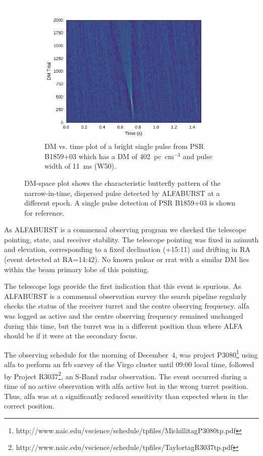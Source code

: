 \documentclass[a4paper,fleqn,usenatbib]{mnras}
\begin{document}
\begin{figure}
\begin{subfigure}[t]{0.5\textwidth}
        \includegraphics[width=1.0\textwidth]{figures/B1859_dmtrials.pdf}
        \caption{DM vs. time plot of a bright single pulse from PSR B1859+03
        which has a DM of 402~pc~cm$^{-3}$ and pulse width of 11~ms (W50).
        }
        \label{fig:dm_time_B1859}
    \end{subfigure}
    \caption{DM-space plot shows the characteristic butterfly pattern of the
    narrow-in-time, dispersed pulse detected by ALFABURST at a different epoch.
    A single pulse detection of PSR B1859+03 is shown for reference.
    }
    \label{fig:dm_time}
\end{figure}

As ALFABURST is a commensal observing program we checked the telescope pointing,
state, and receiver stability.  The telescope pointing was fixed in azimuth and
elevation, corresponding to a fixed declination (+15:11) and drifting in RA
(event detected at RA=14:42). No known pulsar or \gls{rrat} with a similar DM
lies within the beam primary lobe of this pointing.

The telescope logs provide the first indication that this event is spurious. As
ALFABURST is a commensal observation survey the search pipeline regularly checks
the status of the receiver turret and the centre observing frequency. \gls{alfa}
was logged as active and the centre observing frequency remained unchanged
during this time, but the turret was in a different position than where ALFA
should be if it were at the secondary focus.

The observing schedule for the morning of December~4, was project
P3080\footnote{http://www.naic.edu/vscience/schedule/tpfiles/MichillitagP3080tp.pdf}
using \gls{alfa} to perform an \gls{frb} survey of the Virgo cluster until 09:00
local time, followed by Project
R3037\footnote{http://www.naic.edu/vscience/schedule/tpfiles/TaylortagR3037tp.pdf},
an S-Band radar observation.  The event occurred during a time of no active
observation with \gls{alfa} active but in the wrong turret position. Thus,
\gls{alfa} was at a significantly reduced sensitivity than expected when in the
correct position.
\end{document}
